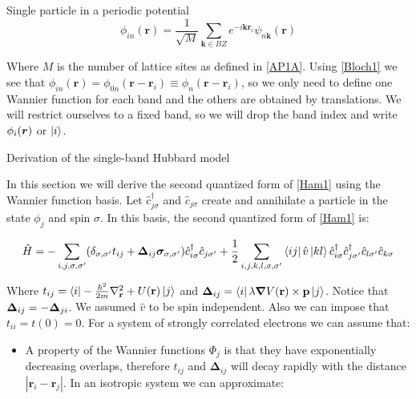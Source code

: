 \begin{section}{Single particle in a periodic potential}
\begin{equation}
\phi_{in}(\textbf{r}) = \frac{1}{\sqrt{M}}\sum_{\textbf{k}\in BZ} e^{-i\textbf{k}\textbf{r}_i} \psi_{n\textbf{k}}(\textbf{r})
\end{equation}

Where $M$ is the number of lattice sites as defined in \ref{AP1A}. Using \ref{Bloch1} we see that $\phi_{in}(\textbf{r}) = \phi_{0n}(\textbf{r}-\textbf{r}_i) \equiv \phi_{n}(\textbf{r}-\textbf{r}_i)$, so we only need to define one Wannier function for each band and the others are obtained by translations. We will restrict ourselves to a fixed band, so we will drop the band index and write $\phi_i(\boldsymbol{r})$ or $\ket{i}$.

\end{section}

\begin{section}{Derivation of the single-band Hubbard model}

In this section we will derive the second quantized form of \ref{Ham1} using the Wannier function basis. Let $\hat{c}_{j \sigma}^\dagger$ and $\hat{c}_{j \sigma}$ create and annihilate a particle in the state $\phi_j$ and spin $\sigma$. In this basis, the second quantized form of \ref{Ham1} is:

\begin{equation}
\hat{H} = -\sum_{i,j,\sigma, \sigma'} (\delta_{\sigma, \sigma'} t_{ij} + \boldsymbol{\Delta}_{ij} \boldsymbol{\sigma}_{\sigma, \sigma'}) \hat{c}_{i \sigma}^\dagger \hat{c}_{j \sigma'} + \frac{1}{2} \sum_{i,j,k,l, \sigma, \sigma'} \bra{ij} \hat{v} \ket{kl} \hat{c}_{i \sigma}^\dagger \hat{c}_{j \sigma'}^\dagger \hat{c}_{l \sigma'} \hat{c}_{k \sigma}
\end{equation}

Where $t_{ij} = \bra{i} -\frac{\hbar^2}{2m}\nabla^2_{\textbf{r}} + U(\textbf{r}) \ket{j}$ and $\boldsymbol{\Delta}_{ij} = \bra{i} \lambda \boldsymbol{\nabla}V(\textbf{r}) \times \textbf{p} \ket{j}$. Notice that $\boldsymbol{\Delta}_{ij} = - \boldsymbol{\Delta}_{ji}$. We assumed $\hat{v}$ to be spin independent. Also we can impose that $t_{ii} = t(0) = 0$. For a system of strongly correlated electrons we can assume that:

\begin{itemize}
\item A property of the Wannier functions $\Phi_j$ is that they have exponentially decreasing overlaps, therefore $t_{ij}$ and $\boldsymbol{\Delta}_{ij}$ will decay rapidly with the distance $|\textbf{r}_i-\textbf{r}_j|$. In an isotropic system we can approximate:


\end{itemize}
\end{section}
